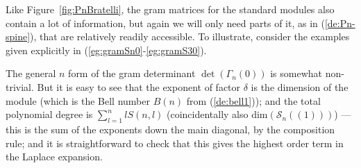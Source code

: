\documentclass[reqno,10pt,a4paper]{amsart}
\newcommand{\C}{\mathbb{C}}
\newcommand{\blue}[1]{\textcolor{blue}{#1}}
\newcommand{\red}[1]{\textcolor{red}{#1}}
\newcommand{\ppm}[1]{\red{#1}}
\newcommand{\ppmy}[1]{}   %
\newcommand{\ca}[1]{\blue{#1}}
\newcommand{\cell}{\mathcal{S}}
\newcommand{\SSS}{\mathcal{S}} %
\newcommand{\Gram}{\Gamma}
\begin{document}
\ppmy{ 
\mdef 
\ppm{[red since now copied in Intro!:]
Over $\C$ the algebras $P_n$ are generically semisimple, 
and in all cases with $\delta\neq 0$ the standard modules give a basis for 
the Grothendieck group,
so much of their combinatorial representation theory  %
is encoded in the standard restriction diagram 
(generically the Bratelli diagram, or else 
a suitably enhanced version thereof)
for the tower of algebras 
$P_n \subset P_{n+1}$
in the generic case.
See Fig.\ref{fig:PnBratelli}.
\\
%
In Fig.\ref{fig:PnBratelli}  %
we also record the morphisms between standard modules 
in the cases $\delta = 1,2$.
%
The Figure encodes a lot of information. However here we
will only need some specific observations from it. 
[-Delete this now!]
}
}

Like Figure~\ref{fig:PnBratelli}, 
the gram matrices for the standard 
modules also 
contain a lot of information, but again 
we will only need parts of it, 
as in (\ref{de:Pn-spine}),
that are relatively readily accessible. 
To illustrate, 
consider the examples given 
explicitly in (\ref{eg:gramSn0}-\ref{eg:gramS30}). 





\mdef  \label{pa:gram-det-order}
The general $n$ form of the gram determinant 
$\det(\Gram_n(0))$
is somewhat non-trivial. But it is 
easy to see that the exponent of factor $\delta$ is 
the dimension of the module
(which is the Bell number $B(n)$ from (\ref{de:bell1})); 
and the total 
polynomial degree is 
$\sum_{l=1}^n l S(n,l) $ 
(coincidentally also dim$(\SSS_n((1)))$)
--- this is the sum of the exponents down the main diagonal, by the composition rule; 
and it is straightforward to check that this gives the highest order term in the Laplace expansion.
\end{document}
